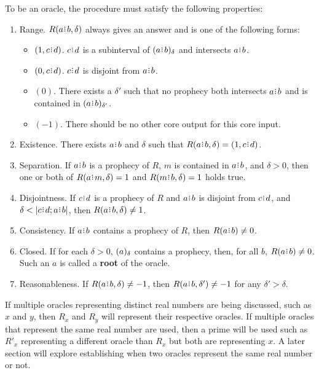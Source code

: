 \documentclass[12pt]{article}
\begin{document}
To be an oracle, the procedure must satisfy the following properties:
\begin{enumerate}
    \item Range. $R(a\rint b, \delta)$  always gives an answer and is one of the following forms: 
    \begin{itemize}
        \item $(1, c\rint d)$. $c\rint d$ is a subinterval of $\halo{a\rint b}$ and intersects $a\rint b$. 
        \item $(0, c\rint d)$. $c \rint d$ is disjoint from $a\rint b$.
        \item $(0)$.  There exists a $\delta'$ such that no prophecy both intersects $a \rint b$ and is contained in $\halo[\delta']{a \rint b}$. 
        \item $(-1)$. There should be no other core output for this core input. 
    \end{itemize} 
    \item Existence. There exists $a \rint b$ and $\delta$ such that $R(a \rint b, \delta) = (1, c\rint d)$. 
    \item Separation. If $a\rint b$ is a prophecy of $R$, $m$ is contained in $a\rint b$, and $\delta > 0$, then one or both of $R(a \rint m, \delta) =1$  and $R(m \rint b, \delta) = 1$ holds true. 
   \item Disjointness. 
   If $c\rint d$ is a prophecy of $R$ and $a\rint b$ is disjoint from $c\rint d$, and $\delta < |c \rint d; a\rint b|$, then $R(a\rint b, \delta) \neq 1$.
    \item Consistency. If $a\rint b$ contains a prophecy of $R$, then $R(a\rint b) \neq 0$. 
    \item Closed. 
    If for each $\delta >0$, $(a)_{\delta}$ contains a prophecy, then, for all $b$, $R(a\rint b) \neq 0$. Such an $a$ is called a \textbf{root} of the oracle. 
    \item Reasonableness. If $R(a\rint b, \delta) \neq -1$, then $R(a\rint b, \delta') \neq -1$ for any $\delta' > \delta$.
\end{enumerate}

If multiple oracles representing distinct real numbers are being discussed, such as $x$ and $y$, then $R_x$ and $R_y$ will represent their respective oracles. If multiple oracles that represent the same real number are used, then a prime will be used such as $R'_x$ representing a different oracle than $R_x$ but both are representing $x$. A later section will explore establishing when two oracles represent the same real number or not. 
\end{document}
